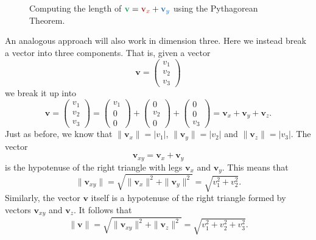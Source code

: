 \begin{figure}[ht]
 \centering
 \caption{Computing the length of $\clg{\mathbf{v}} = \clr{\mathbf{v}_x} +
 \clb{\mathbf{v}_y}$ using the Pythagorean Theorem.}
 \label{fig:vector-pythagoras}
\end{figure}

An analogous approach will also work in dimension three. Here we instead break a
vector into three components. That is, given a vector
\[
 \mathbf{v} = 
 \begin{pmatrix}
  v_1\\
  v_2\\
  v_3
 \end{pmatrix}
\]
we break it up into
\[
 \mathbf{v} =
 \begin{pmatrix}
  v_1\\
  v_2\\
  v_3
 \end{pmatrix}
 = 
 \begin{pmatrix}
  v_1\\
  0\\
  0
 \end{pmatrix}
 + 
 \begin{pmatrix}
  0\\
  v_2\\
  0
 \end{pmatrix}
 + 
 \begin{pmatrix}
  0\\
  0\\
  v_3
 \end{pmatrix}
 = \mathbf{v}_x + \mathbf{v}_y + \mathbf{v}_z.
\]
Just as before, we know that $\|\mathbf{v}_x\| = |v_1|$, $\|\mathbf{v}_y\| =
|v_2|$ and $\|\mathbf{v}_z\| = |v_3|$. The vector
\[
 \mathbf{v}_{xy} = \mathbf{v}_x + \mathbf{v}_y
\]
is the hypotenuse of the right triangle with legs $\mathbf{v}_x$ and
$\mathbf{v}_y$. This means that
\[
 \|\mathbf{v}_{xy}\| = \sqrt{\|\mathbf{v}_x\|^2 + \|\mathbf{v}_y\|^2} =
 \sqrt{v_1^2 + v_2^2}.
\]
Similarly, the vector $\mathbf{v}$ itself is a hypotenuse of the right triangle
formed by vectors $\mathbf{v}_{xy}$ and $\mathbf{v}_z$. It follows that
\[
 \|\mathbf{v}\| = \sqrt{\|\mathbf{v}_{xy}\|^2 + \|\mathbf{v}_z\|^2} =
 \sqrt{v_1^2 + v_2^2 + v_3^2}.
\]

